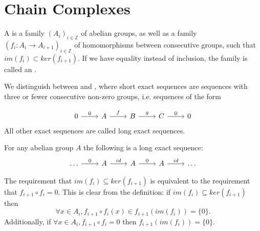 \section{Chain Complexes}\label{sec-chain-complexes}
\begin{definition}
A  is a family $(A_i)_{i\in\mathbb{Z}}$ of abelian groups, as well as a family $(f_i:A_i\rightarrow A_{i+1})_{i\in \mathbb{Z}}$ of homomorphisms between consecutive groups, such that $im(f_i)\subset ker(f_{i+1})$. If we have equality instead of inclusion, the family is called an .
\end{definition}

We distinguish between  and , where short exact sequences are sequences with three or fewer consecutive non-zero groups, i.e. sequences of the form

\[\begin{tikzcd}
0 \arrow[r, "0"] & A \arrow[r, "f"] & B \arrow[r, "g"] & C \arrow[r, "0"] & 0
\end{tikzcd}\]
All other exact sequences are called long exact sequences. 

\begin{example}
For any abelian group $A$ the following is a long exact sequence:
\[\begin{tikzcd}
\dots \arrow[r, "0"] & A \arrow[r, "id"] & A \arrow[r, "0"] & A \arrow[r, "id"] & \dots
\end{tikzcd}\]
\end{example}

\begin{remark}
The requirement that $im(f_i)\subseteq ker(f_{i+1})$  is equivalent to the requirement that $f_{i+1}\circ f_i=0$. This is clear from the definition: if $im(f_i)\subseteq ker(f_{i+1})$ then $$\forall x\in A_i, f_{i+1}\circ f_i (x)\in f_{i+1}(im(f_i))=\{0\}.$$ Additionally, if $\forall x\in A_i, f_{i+1}\circ f_i=0$ then $f_{i+1}(im(f_i))=\{0\}$.
\end{remark}


